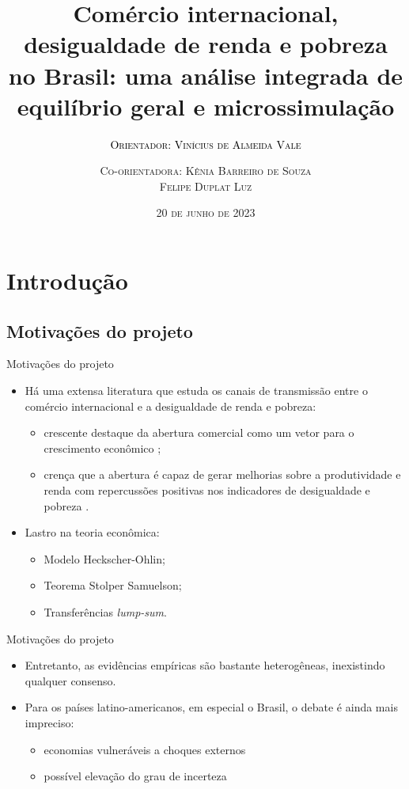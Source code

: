 \documentclass[10pt]{sintefbeamer}
\title{\large Comércio internacional, desigualdade de renda e pobreza no Brasil: uma análise integrada de equilíbrio geral e microssimulação}
\subtitle{\textsc{\textcolor{black}{Orientador: Vinícius de Almeida Vale}}}
\author{\textsc{Co-orientadora: Kênia Barreiro de Souza \\ Felipe Duplat Luz}}
\date{\textsc{20 de junho de 2023}}
\begin{document}
\maketitle

\section{Introdução}

\subsection[]{Motivações do projeto}

\begin{frame}{Motivações do projeto}
	\begin{itemize}[<+->]
		\item Há uma extensa literatura que estuda os canais de transmissão entre o comércio internacional e a desigualdade de renda e pobreza:
		
		\begin{itemize}
			\item crescente destaque da abertura comercial como um vetor para o crescimento econômico \cite{sala07};
			
			\item crença que a abertura é capaz de gerar melhorias sobre a produtividade e renda com repercussões positivas nos indicadores de desigualdade e pobreza \cite{carneiroarbache03}.
		\end{itemize}
		
		\item Lastro na teoria econômica:
		
		\begin{itemize}
			\item Modelo Heckscher-Ohlin;
			\item Teorema Stolper Samuelson;
			\item Transferências \textit{lump-sum}.
		\end{itemize}
	\end{itemize}
\end{frame}

\begin{frame}{Motivações do projeto}
	\begin{itemize}[<+->]
		\item Entretanto, as evidências empíricas são bastante heterogêneas, inexistindo qualquer consenso.
		
		\item Para os países latino-americanos, em especial o Brasil, o debate é ainda mais impreciso:
		
		\begin{itemize}
			\item economias vulneráveis a choques externos \cite{bannisterthugge01}
			
			\item possível elevação do grau de incerteza \cite{winters02}
		\end{itemize}
	\end{itemize}
\end{frame}
\end{document}
